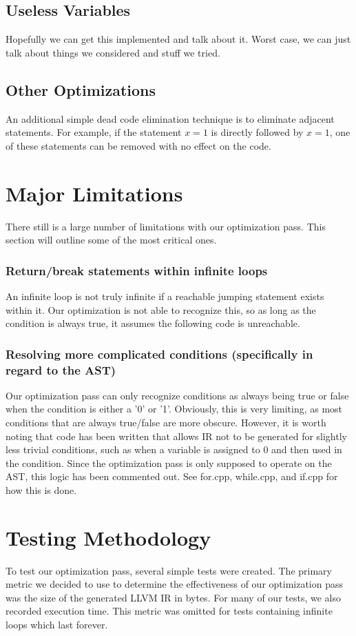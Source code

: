 \documentclass[sigconf]{acmart}
\begin{document}
\subsection{Useless Variables}
Hopefully we can get this implemented and talk about it. Worst case, we can just talk about things we considered 
and stuff we tried.

\subsection{Other Optimizations}
An additional simple dead code elimination technique is to eliminate adjacent statements.
For example, if the statement $x = 1$ is directly followed by $x = 1$, one of these statements can be removed with 
no effect on the code.

\section{Major Limitations}
There still is a large number of limitations with our optimization pass. This section will outline some of the 
most critical ones.

\subsubsection{Return/break statements within infinite loops}
An infinite loop is not truly infinite if a reachable jumping statement exists within it. 
Our optimization is not able to recognize this, so as long as the condition is always true, it assumes 
the following code is unreachable. 

\subsubsection{Resolving more complicated conditions (specifically in regard to the AST)}
Our optimization pass can only recognize conditions as always being true or false when the condition is either a 
'0' or '1'. Obviously, this is very limiting, as most conditions that are always true/false are more obscure. However, it is worth noting that code has been written that allows IR not to be generated for slightly less 
trivial conditions, such as when a variable is assigned to 0 and then used in the condition. 
Since the optimization pass is only supposed to operate on the AST, this logic has been commented out. See for.cpp, while.cpp, and 
if.cpp for how this is done.


\section{Testing Methodology}
To test our optimization pass, several simple tests were created. The primary metric 
we decided to use to determine the effectiveness of our optimization pass was the size of the generated 
LLVM IR in bytes. For many of our tests, we also recorded execution time. This metric was omitted 
for tests containing infinite loops which last forever.
\end{document}
